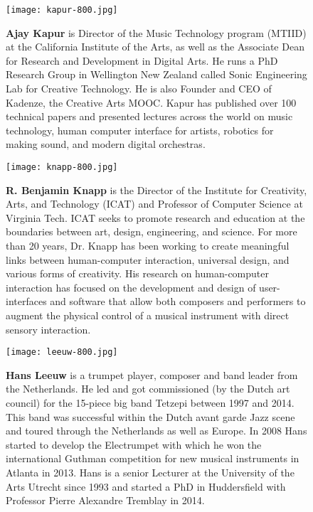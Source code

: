 \begin{authbio}
\begin{figure}[H]
  \sidecaption[t]
  \texttt{[image: kapur-800.jpg]}
  \caption{\textbf{Ajay Kapur} is Director of the Music Technology program (MTIID) at the California Institute of the Arts, as well as the Associate Dean for Research and Development in Digital Arts. He runs a PhD Research Group in Wellington New Zealand called Sonic Engineering Lab for Creative Technology. He is also Founder and CEO of Kadenze, the Creative Arts MOOC. Kapur has published over 100 technical papers and presented lectures across the world on music technology, human computer interface for artists, robotics for making sound, and modern digital orchestras.}
\end{figure}

\begin{figure}[H]
  \sidecaption[t]
  \texttt{[image: knapp-800.jpg]}
  \caption{\textbf{R. Benjamin Knapp} is the Director of the Institute for Creativity, Arts, and Technology (ICAT) and Professor of Computer Science at Virginia Tech. ICAT seeks to promote research and education at the boundaries between art, design, engineering, and science. For more than 20 years, Dr. Knapp has been working to create meaningful links between human-computer interaction, universal design, and various forms of creativity. His research on human-computer interaction has focused on the development and design of user-interfaces and software that allow both composers and performers to augment the physical control of a musical instrument with direct sensory interaction.}
\end{figure}

\begin{figure}[H]
  \sidecaption[t]
  \texttt{[image: leeuw-800.jpg]}
  \caption{\textbf{Hans Leeuw} is a trumpet player, composer and band leader from the Netherlands. He led and got commissioned (by the Dutch art council) for the 15-piece big band Tetzepi between 1997 and 2014. This band was successful within the Dutch avant garde Jazz scene and toured through the Netherlands as well as Europe. In 2008 Hans started to develop the Electrumpet with which he won the international Guthman competition for new musical instruments in Atlanta in 2013. Hans is a senior Lecturer at the University of the Arts Utrecht since 1993 and started a PhD in Huddersfield with Professor Pierre Alexandre Tremblay in 2014.}
\end{figure}



\end{authbio}
